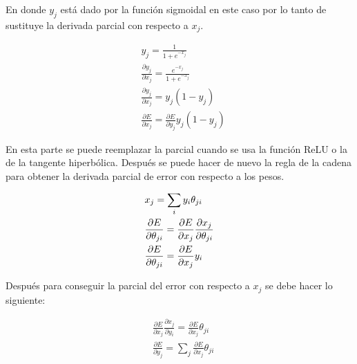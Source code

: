 En donde $y_{j}$ está dado por la función sigmoidal en este caso por lo tanto de sustituye la derivada parcial con respecto a $x_{j}$.
\begin{spreadlines}{10pt}
	\begin{alignat}{4}
		 & y_{j} =\frac{1}{1+e^{-x_{j}}}                                                         \\
		 & \frac{\partial y_{j}}{\partial x_{j}} =\frac{e^{-x_{j}}}{1+e^{-x_{j}}}                \\
		 & \frac{\partial y_{j}}{\partial x_{j}}=y_{j} (1-y_{j})                                 \\
		 & \frac{\partial E}{\partial x_{j}} =\frac{\partial E}{\partial y_{j}}  y_{j}( 1-y_{j})
	\end{alignat}
\end{spreadlines}

\par En esta parte se puede reemplazar la parcial cuando se usa la función \gls{ReLU} o la de la tangente hiperbólica. Después se puede hacer de nuevo la regla de la cadena para obtener la derivada parcial de error con respecto a los pesos.

\begin{spreadlines}{10pt}
	\begin{alignat}{3}
		 & x_{j}=\sum_{i} y_{i}\theta_{ji}                                                                                          \\ \vspace{100pt}
		 & \frac{\partial E}{\partial \theta _{ji}} =\frac{\partial E}{\partial x_{j}} \frac{\partial x_{j}}{\partial \theta _{ji}} \\
		 & \frac{\partial E}{\partial \theta _{ji}} =\frac{\partial E}{\partial x_{j}}y_{i}
	\end{alignat}
\end{spreadlines}

\par Después para conseguir la parcial del error con respecto a $x_{j}$ se debe hacer lo siguiente:

\begin{spreadlines}{10pt}
	\begin{alignat}{3}
		 & \frac{\partial E}{\partial x_{j}} \frac{\partial x_{j}}{\partial y_{i}} =\frac{\partial E}{\partial x_{j}} \theta _{ji} \\
		 & \frac{\partial E}{\partial y_{j}} =\sum _{j}\frac{\partial E}{\partial x_{j}} \theta _{ji}
	\end{alignat}
\end{spreadlines}

